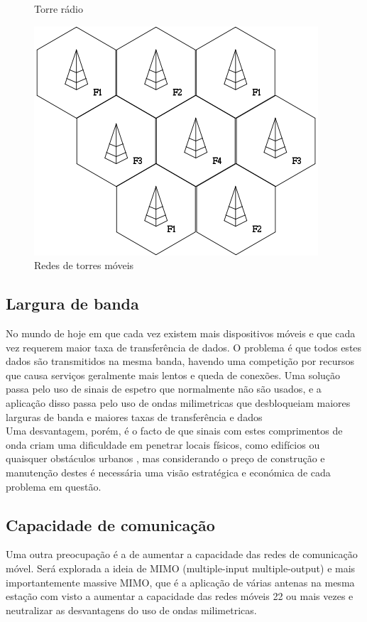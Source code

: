 \documentclass{llncs}
\begin{document}
\begin{figure}[H]
\begin{minipage}{0.45\textwidth}
        \caption{Torre rádio \cite{img1}}
    \end{minipage}\hfill
    \begin{minipage}{0.45\textwidth}
        \centering
        \includegraphics[scale=0.5]{network.png}
        \caption{Redes de torres móveis \cite{img2}}
    \end{minipage}
\end{figure}

\subsection{Largura de banda}
\hspace*{1.5em} No mundo de hoje em que cada vez existem mais dispositivos móveis e que cada vez requerem maior taxa de transferência de dados. O problema é que todos estes dados são transmitidos na mesma banda, havendo uma competição por recursos que causa serviços geralmente mais lentos e queda de conexões. Uma solução passa pelo uso de sinais de espetro que normalmente não são usados, e a aplicação disso passa pelo uso de ondas milimetricas que desbloqueiam maiores larguras de banda e maiores taxas de transferência e dados \cite{Mis:El} \\
\hspace*{1.5em} Uma desvantagem, porém, é o facto de que sinais com estes comprimentos de onda criam uma dificuldade em penetrar locais físicos, como edifícios ou quaisquer obstáculos urbanos \cite{everything:to:know}, mas considerando o preço de construção e manutenção destes é necessária uma visão estratégica e económica de cada problema em questão.
\subsection{Capacidade de comunicação}
\hspace*{1.5em} Uma outra preocupação é a de aumentar a capacidade das redes de comunicação móvel. Será explorada a ideia de MIMO (multiple-input multiple-output) e mais importantemente massive MIMO, que é a aplicação de várias antenas na mesma estação com visto a aumentar a capacidade das redes móveis 22 ou mais vezes \cite{everything:to:know} e neutralizar as desvantagens do uso de ondas milimetricas. \cite{Mis:El}
\end{document}
